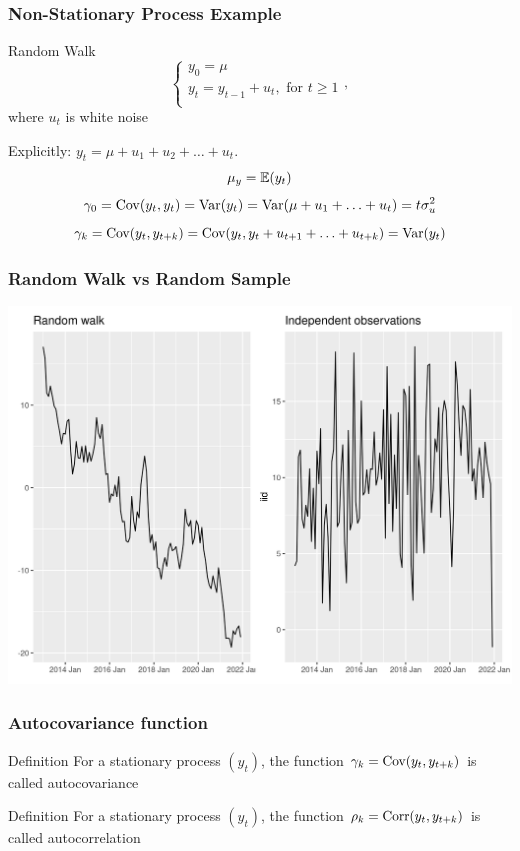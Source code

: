 \begin{frame}
	\frametitle{Non-Stationary Process Example}
	
	\begin{block}{Random Walk}
		\[
		\begin{cases}
			y_0 = \mu \\
			y_t = y_{t-1} + u_t, \text{ for } t \geq 1 \\
		\end{cases},
		\]
		where $u_t$ is white noise
	\end{block}
	
	\pause
	
	\centering
	
	Explicitly: $y_t = \mu + u_1 + u_2 + \ldots + u_t$.
	\pause
	\[
	\mu_y = \mathbb{E}(y_t)
	\]
	\pause
	\[
	\gamma_0 = \operatorname{Cov}(y_t, y_t) = \operatorname{Var}(y_t) = \operatorname{Var}(\mu + u_1 + \ldots + u_t) = t\sigma^2_u
	\]
	\pause
	\[
	\gamma_k = \operatorname{Cov}(y_t, y_{t+k}) = \operatorname{Cov}(y_t, y_t + u_{t+1} + \ldots + u_{t+k}) = \operatorname{Var}(y_t)
	\]
\end{frame}

\begin{frame}
	\frametitle{Random Walk vs Random Sample}
	
	\includegraphics[width=\textwidth]{pictures/om_ts_04-028.png}
	
	
\end{frame}









\begin{frame}
	\frametitle{Autocovariance function}
	
	\begin{block}{Definition}
		For a stationary process $(y_t)$, the function $\gamma_k = \operatorname{Cov}(y_t, y_{t+k})$
		is called \alert{autocovariance}
	\end{block}
	
	\pause
	\begin{block}{Definition}
		For a stationary process $(y_t)$, the function $\rho_k = \operatorname{Corr}(y_t, y_{t+k})$
		is called \alert{autocorrelation}
	\end{block}
\end{frame}



